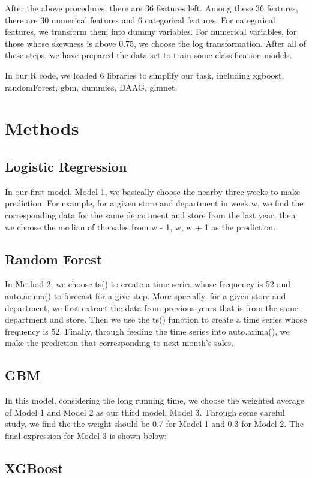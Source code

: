 \documentclass[12pt]{article}
\begin{document}
After the above procedures, there are 36 features left. Among these 36 features, there are 30 numerical features and 6 categorical features. For categorical features, we transform them into dummy variables. For numerical variables, for those whose skewness is above 0.75, we choose the log transformation. After all of these steps, we have prepared the data set to train some classification models.

In our R code, we loaded 6 libraries to simplify our task, including xgboost, randomForest, gbm, dummies, DAAG, glmnet.


\section{Methods}

\subsection{Logistic Regression}
In our first model, Model 1, we basically choose the nearby three weeks to make prediction. For example, for a given store and department in week w, we find the corresponding data for the same department and store from the last year, then we choose the median of the sales from w - 1, w, w + 1 as the prediction.

\subsection{Random Forest}
In Method 2, we choose ts() to create a time series whose frequency is 52 and auto.arima() to forecast for a give step. More specially, for a given store and department, we first extract the data from previous years that is from the same department and store. Then we use the ts() function to create a time series whose frequency is 52. Finally, through feeding the time series into auto.arima(), we make the prediction that corresponding to next month's sales.

\subsection{GBM}
In this model, considering the long running time, we choose the weighted average of Model 1 and Model 2 as our third model, Model 3. Through some careful study, we find the the weight should be 0.7 for Model 1 and 0.3 for Model 2. The final expression for Model 3 is shown below:

\subsection{XGBoost}
\end{document}
